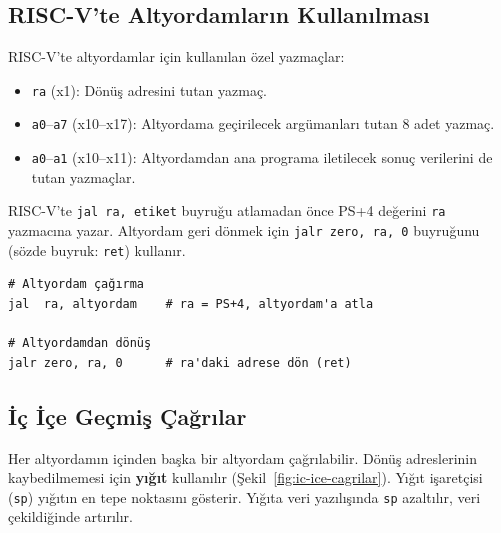 \subsection{RISC-V'te Altyordamların Kullanılması}

RISC-V'te altyordamlar için kullanılan özel yazmaçlar:
\begin{itemize}
\item \texttt{ra} (x1): Dönüş adresini tutan yazmaç.
\item \texttt{a0}--\texttt{a7} (x10--x17): Altyordama geçirilecek argümanları tutan 8 adet yazmaç.
\item \texttt{a0}--\texttt{a1} (x10--x11): Altyordamdan ana programa iletilecek sonuç verilerini de tutan yazmaçlar.
\end{itemize}

RISC-V'te \texttt{jal ra, etiket} buyruğu atlamadan önce PS+4 değerini \texttt{ra} yazmacına yazar. Altyordam geri dönmek için \texttt{jalr zero, ra, 0} buyruğunu (sözde buyruk: \texttt{ret}) kullanır.

\begin{lstlisting}[style=riscv]
# Altyordam çağırma
jal  ra, altyordam    # ra = PS+4, altyordam'a atla

# Altyordamdan dönüş
jalr zero, ra, 0      # ra'daki adrese dön (ret)
\end{lstlisting}

\subsection{İç İçe Geçmiş Çağrılar}

Her altyordamın içinden başka bir altyordam çağrılabilir. Dönüş adreslerinin kaybedilmemesi için \textbf{yığıt} kullanılır (Şekil~\ref{fig:ic-ice-cagrilar}). Yığıt işaretçisi (\texttt{sp}) yığıtın en tepe noktasını gösterir. Yığıta veri yazılışında \texttt{sp} azaltılır, veri çekildiğinde artırılır.

